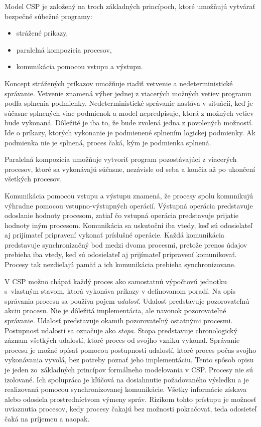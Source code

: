 \documentclass[
  biblatex,
  seconds=true,
  language=slovak,
  figures=false,
  urldate=iso,
  glossaries,
  index
]{kidiplom}
\begin{document}
Model CSP je založený na troch základných princípoch, ktoré umožňujú vytvárať bezpečné súbežné programy:
\begin{itemize}
	\item strážené príkazy,
	\item paralelná kompozícia procesov,
	\item komunikácia pomocou vstupu a výstupu.
\end{itemize}
Koncept strážených príkazov umožňuje riadiť vetvenie a nedeterministické správanie. Vetvenie znamená výber jednej z viacerých možných vetiev programu podľa splnenia podmienky. Nedeterministické správanie nastáva v situácii, keď je súčasne splnených viac podmienok a model nepredpisuje, ktorá z možných vetiev bude vykonaná. Dôležité je iba to, že bude zvolená jedna z povolených možností.
Ide o príkazy, ktorých vykonanie je podmienené splnením logickej podmienky.
Ak podmienka nie je splnená, proces čaká, kým je podmienka splnená.

Paralelná kompozícia umožňuje vytvoriť program pozostávajúci z viacerých procesov, ktoré sa vykonávajú súčasne, nezávisle od seba a končia až po ukončení všetkých procesov. 

Komunikácia pomocou vstupu a výstupu znamená, že procesy spolu komunikujú výhradne
pomocou vstupno-výstupných operácií. Výstupná operácia predstavuje odoslanie hodnoty procesom, zatiaľ čo vstupná operácia predstavuje prijatie hodnoty iným procesom. Komunikácia sa uskutoční iba vtedy, keď sú odosielateľ aj prijímateľ pripravení vykonať príslušné operácie.
Každá komunikácia predstavuje synchronizačný bod medzi dvoma procesmi, pretože prenos údajov prebieha iba vtedy, keď sú odosielateľ aj prijímateľ pripravení komunikovať.
Procesy tak nezdieľajú pamäť a ich komunikácia prebieha synchronizovane.

V CSP možno chápať každý proces ako samostatnú výpočtovú jednotku s~vlastným stavom, ktorá vykonáva príkazy v definovanom poradí.
Na opis správania procesu sa používa pojem \emph{udalosť}. Udalosť predstavuje pozorovateľnú akciu procesu. Nie je dôležitá implementácia, ale navonok pozorovateľné správanie.
Udalosť predstavuje okamih
pozorovateľný ostatnými procesmi. Postupnosť udalostí sa označuje ako \emph{stopa}. Stopa predstavuje
chronologický záznam všetkých udalostí, ktoré proces od svojho vzniku vykonal.
Správanie procesu je možné opísať pomocou postupnosti udalostí, ktoré proces počas svojho vykonávania vyvolá, bez potreby poznať jeho implementáciu.
Tento spôsob opisu je jeden zo~základných princípov formálneho modelovania v CSP.
Procesy nie sú izolované. Ich spolupráca je kľúčová na dosiahnutie požadovaného výsledku a je realizovaná
pomocou synchronizovanej komunikácie.
Všetky informácie získava alebo odosiela
prostredníctvom výmeny správ. 
Rizikom tohto prístupu je možnosť uviaznutia procesov, kedy procesy čakajú bez možnosti pokračovať, teda odosieteľ čaká na príjemcu a naopak.
\end{document}
